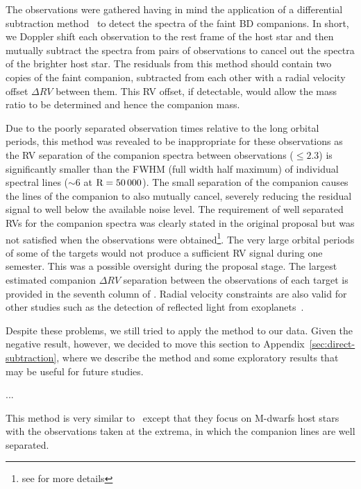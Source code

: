 The observations were gathered having in mind the application of a differential subtraction method~\citep[e.g.,][]{ferluga_separating_1997, kostogryz_spectral_2013} to detect the spectra of the faint {BD} companions. In short, we Doppler shift each observation to the rest frame of the host star and then mutually subtract the spectra from pairs of observations to cancel out the spectra of the brighter host star. The residuals from this method should contain two copies of the faint companion, subtracted from each other with a radial velocity offset \(\Delta {RV}\) between them. This {RV} offset, if detectable, would allow the mass ratio to be determined and hence the companion mass.

Due to the poorly separated observation times relative to the long orbital periods, this method was revealed to be inappropriate for these observations as the {RV} separation of the companion spectra between observations (\(\le 2.3\)\kmps{}) is significantly smaller than the {FWHM} (full width half maximum) of individual spectral lines (\(\sim\)6\kmps{} at \(\rm R=50\,000\)). The small separation of the companion causes the lines of the companion to also mutually cancel, severely reducing the residual signal to well below the available noise level. The requirement of well separated RVs for the companion spectra was clearly stated in the original proposal but was not satisfied when the observations were obtained\footnote{see  for more details}. {\red{} The very large orbital periods of some of the targets would not produce a sufficient {RV} signal during one semester. This was a possible oversight during the proposal stage.} The largest estimated companion \(\Delta {RV}\) separation between the observations of each target is provided in the seventh column of . Radial velocity constraints are also valid for other studies such as the detection of reflected light from exoplanets~\cite{martins_evidence_2015}.

{\red{} Despite these problems, we still tried to apply the method to our data. Given the negative result, however, we decided to move this section to Appendix~\ref{sec:direct-subtraction}, where we describe the method and some exploratory results that may be useful for future studies.
}


...

This method is very similar to~\citet{kostogryz_spectral_2013} except that they focus on M-dwarfs host stars with the observations taken at the extrema, in which the companion lines are well separated. 
